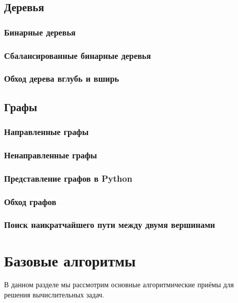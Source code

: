 \section{Деревья}

\subsection{Бинарные деревья}

\subsection{Сбалансированные бинарные деревья}

\subsection{Обход дерева вглубь и вширь}

\section{Графы}

\subsection{Направленные графы}

\subsection{Ненаправленные графы}

\subsection{Представление графов в Python}

\subsection{Обход графов}

\subsection{Поиск наикратчайшего пути между двумя вершинами}

\chapter{Базовые алгоритмы}

В данном разделе мы рассмотрим основные алгоритмические приёмы 
для решения вычислительных задач. 

